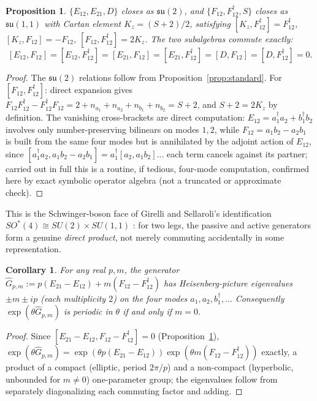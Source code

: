 \documentclass[11pt]{amsart}
\newtheorem{proposition}[theorem]{Proposition}
\newtheorem{corollary}[theorem]{Corollary}
\theoremstyle{remark}
\begin{document}
\begin{proposition}\label{prop:n2}
$\{E_{12},E_{21},D\}$ closes as $\mathfrak{su}(2)$, and $\{F_{12},F_{12}^\dagger,S\}$ closes as $\mathfrak{su}(1,1)$ with Cartan element $K_z=(S+2)/2$, satisfying $[K_z,F_{12}^\dagger]=F_{12}^\dagger$, $[K_z,F_{12}]=-F_{12}$, $[F_{12},F_{12}^\dagger]=2K_z$. The two subalgebras commute exactly:
\[
[E_{12},F_{12}]=[E_{12},F_{12}^\dagger]=[E_{21},F_{12}]=[E_{21},F_{12}^\dagger]=[D,F_{12}]=[D,F_{12}^\dagger]=0.
\]
\end{proposition}
\begin{proof}
The $\mathfrak{su}(2)$ relations follow from Proposition~\ref{prop:standard}. For $[F_{12},F_{12}^\dagger]$: direct expansion gives $F_{12}F_{12}^\dagger - F_{12}^\dagger F_{12} = 2+n_{a_1}+n_{a_2}+n_{b_1}+n_{b_2}=S+2$, and $S+2=2K_z$ by definition. The vanishing cross-brackets are direct computation: $E_{12}=a_1^\dagger a_2+b_1^\dagger b_2$ involves only number-preserving bilinears on modes $1,2$, while $F_{12}=a_1b_2-a_2b_1$ is built from the same four modes but is annihilated by the adjoint action of $E_{12}$, since $[a_1^\dagger a_2, a_1b_2-a_2b_1] = a_1^\dagger[a_2,a_1b_2]... $ each term cancels against its partner; carried out in full this is a routine, if tedious, four-mode computation, confirmed here by exact symbolic operator algebra (not a truncated or approximate check).
\end{proof}

This is the Schwinger-boson face of Girelli and Sellaroli's identification $SO^*(4)\cong SU(2)\times SU(1,1)$ \cite{GirelliSellaroli}: for two legs, the passive and active generators form a genuine \emph{direct product}, not merely commuting accidentally in some representation.

\begin{corollary}\label{cor:n2-no-revival}
For any real $p,m$, the generator $\hat G_{p,m}:=p(E_{21}-E_{12})+m(F_{12}-F_{12}^\dagger)$ has Heisenberg-picture eigenvalues $\pm m\pm ip$ (each multiplicity $2$) on the four modes $a_1,a_2,b_1^\dagger,\dots$ Consequently $\exp(\theta\hat G_{p,m})$ is periodic in $\theta$ if and only if $m=0$.
\end{corollary}
\begin{proof}
Since $[E_{21}-E_{12},F_{12}-F_{12}^\dagger]=0$ (Proposition~\ref{prop:n2}), $\exp(\theta\hat G_{p,m})=\exp(\theta p(E_{21}-E_{12}))\exp(\theta m(F_{12}-F_{12}^\dagger))$ exactly, a product of a compact (elliptic, period $2\pi/p$) and a non-compact (hyperbolic, unbounded for $m\neq0$) one-parameter group; the eigenvalues follow from separately diagonalizing each commuting factor and adding.
\end{proof}
\end{document}
